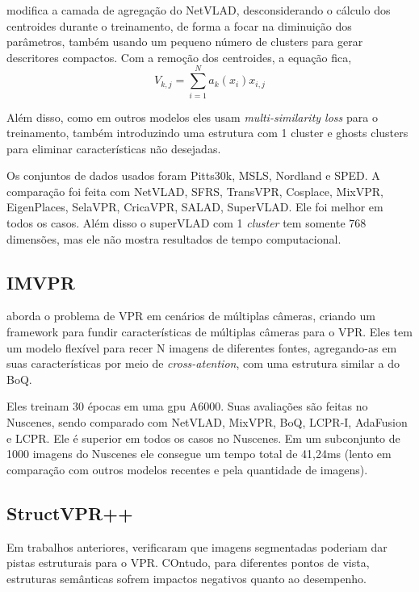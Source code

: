 \documentclass[letterpaper, 10 pt, conference]{ieeeconf}  %
\begin{document}
\cite{supervlad} modifica a camada de agregação do NetVLAD, desconsiderando o cálculo dos centroides durante o treinamento, de forma a focar na diminuição dos parâmetros, também usando um pequeno número de clusters para gerar descritores compactos. Com a remoção dos centroides, a equação fica,
$$
V_{k,j} = \sum_{i=1}^{N} a_k(x_i) x_{i,j}
$$

Além disso, como em outros modelos eles usam \textit{multi-similarity loss} para o treinamento, também introduzindo uma estrutura com 1 cluster e ghosts clusters para eliminar características não desejadas.

Os conjuntos de dados usados foram Pitts30k, MSLS, Nordland e SPED. A comparação foi feita com NetVLAD, SFRS, TransVPR, Cosplace, MixVPR, EigenPlaces, SelaVPR, CricaVPR, SALAD, SuperVLAD. Ele foi melhor em todos os casos. Além disso o superVLAD com 1 \textit{cluster} tem somente 768 dimensões, mas ele não mostra resultados de tempo computacional.

\subsection{IMVPR}

\cite{imvpr} aborda o problema de VPR em cenários de múltiplas câmeras, criando um framework para fundir características de múltiplas câmeras para o VPR. Eles tem um modelo flexível para recer N imagens de diferentes fontes, agregando-as em suas características por meio de \textit{cross-atention}, com uma estrutura similar a do BoQ\cite{boq}.

Eles treinam 30 épocas em uma gpu A6000. Suas avaliações são feitas no Nuscenes, sendo comparado com NetVLAD, MixVPR, BoQ, LCPR-I, AdaFusion e LCPR. Ele é superior em todos os casos no Nuscenes. Em um subconjunto de 1000 imagens do Nuscenes ele consegue um tempo total de 41,24ms (lento em comparação com outros modelos recentes e pela quantidade de imagens).

\subsection{StructVPR++}
Em trabalhos anteriores, \cite{structvpr++} verificaram que imagens segmentadas poderiam dar pistas estruturais para o VPR. COntudo, para diferentes pontos de vista, estruturas semânticas sofrem impactos negativos quanto ao desempenho. 
\end{document}
